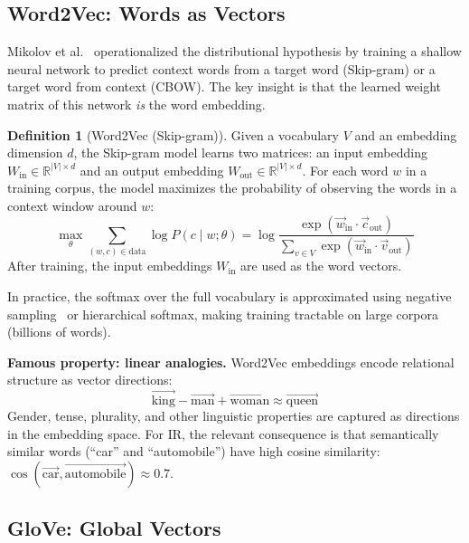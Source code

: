 \documentclass[11pt,a4paper]{article}
\theoremstyle{definition}
\newtheorem{definition}{Definition}[section]
\theoremstyle{plain}
\begin{document}
\subsection{Word2Vec: Words as Vectors}

Mikolov et al.~\cite{mikolov2013efficient} operationalized the distributional hypothesis by training a shallow neural network to predict context words from a target word (Skip-gram) or a target word from context (CBOW). The key insight is that the learned weight matrix of this network \emph{is} the word embedding.

\begin{definition}[Word2Vec (Skip-gram)]
Given a vocabulary $V$ and an embedding dimension $d$, the Skip-gram model learns two matrices: an input embedding $W_\text{in} \in \mathbb{R}^{|V| \times d}$ and an output embedding $W_\text{out} \in \mathbb{R}^{|V| \times d}$. For each word $w$ in a training corpus, the model maximizes the probability of observing the words in a context window around $w$:
\begin{equation}
\max_\theta \sum_{(w, c) \in \text{data}} \log P(c \mid w; \theta) = \log \frac{\exp(\vec{w}_\text{in} \cdot \vec{c}_\text{out})}{\sum_{v \in V} \exp(\vec{w}_\text{in} \cdot \vec{v}_\text{out})}
\end{equation}
After training, the input embeddings $W_\text{in}$ are used as the word vectors.
\end{definition}

In practice, the softmax over the full vocabulary is approximated using negative sampling~\cite{mikolov2013distributed} or hierarchical softmax, making training tractable on large corpora (billions of words).

\textbf{Famous property: linear analogies.} Word2Vec embeddings encode relational structure as vector directions:
\begin{equation}
\vec{\text{king}} - \vec{\text{man}} + \vec{\text{woman}} \approx \vec{\text{queen}}
\end{equation}
Gender, tense, plurality, and other linguistic properties are captured as directions in the embedding space. For IR, the relevant consequence is that semantically similar words (``car'' and ``automobile'') have high cosine similarity: $\cos(\vec{\text{car}}, \vec{\text{automobile}}) \approx 0.7$.

\subsection{GloVe: Global Vectors}
\end{document}

